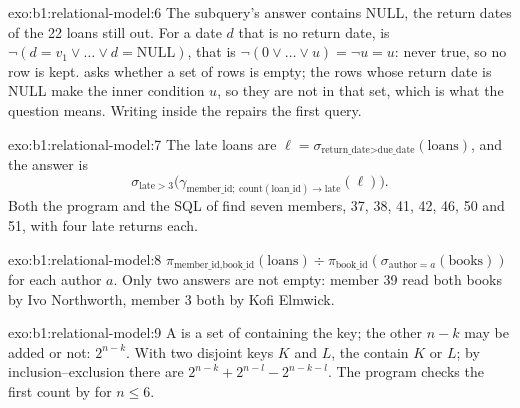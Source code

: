\begin{solution}{exo:b1:relational-model:6}
The subquery's answer contains NULL, the return dates of the 22 loans still out. For a date $d$ that is no return date,
 is $\neg(d = v_1 \vee \dots \vee d = \text{NULL})$, that is $\neg(0 \vee \dots \vee u) = \neg u =
u$: never true, so no row is kept.  asks whether a set of rows is empty; the rows whose return date is
NULL make the inner condition $u$, so they are not in that set, which is what the question means. Writing  inside the  repairs the first query.
\end{solution}

\begin{solution}{exo:b1:relational-model:7}
The late loans are $\ell = \sigma_{\text{return\_date} > \text{due\_date}}(\text{loans})$, and the answer is
\[ \sigma_{\text{late} > 3}\big(\gamma_{\text{member\_id};\ \text{count}(\text{loan\_id}) \to \text{late}}(\ell)\big). \]
Both
the program and the SQL of  find seven members, 37, 38, 41, 42, 46, 50 and 51, with four late
returns each.
\end{solution}

\begin{solution}{exo:b1:relational-model:8}
$\pi_{\text{member\_id}, \text{book\_id}}(\text{loans}) \div \pi_{\text{book\_id}}(\sigma_{\text{author} = a}(\text{books}))$
for each author $a$. Only two answers are not empty: member 39 read both books by Ivo Northworth, member 3 both by Kofi
Elmwick.
\end{solution}

\begin{solution}{exo:b1:relational-model:9}
A  is a set of  containing the key; the other $n - k$  may be added or not: $2^{n - k}$. With
two disjoint keys $K$ and $L$, the  contain $K$ or $L$; by inclusion--exclusion there are $2^{n - k} + 2^{n - l}
- 2^{n - k - l}$. The program  checks the first count by  for $n \leq 6$.
\end{solution}

